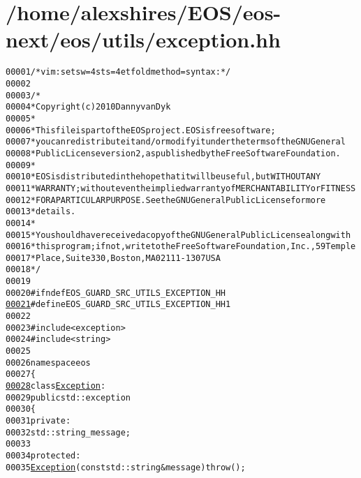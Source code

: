 \hypertarget{exception_8hh_source}{
\section{/home/alexshires/EOS/eos-\/next/eos/utils/exception.hh}
}


\begin{footnotesize}\begin{alltt}
00001 \textcolor{comment}{/* vim: set sw=4 sts=4 et foldmethod=syntax : */}
00002 
00003 \textcolor{comment}{/*}
00004 \textcolor{comment}{ * Copyright (c) 2010 Danny van Dyk}
00005 \textcolor{comment}{ *}
00006 \textcolor{comment}{ * This file is part of the EOS project. EOS is free software;}
00007 \textcolor{comment}{ * you can redistribute it and/or modify it under the terms of the GNU General}
00008 \textcolor{comment}{ * Public License version 2, as published by the Free Software Foundation.}
00009 \textcolor{comment}{ *}
00010 \textcolor{comment}{ * EOS is distributed in the hope that it will be useful, but WITHOUT ANY}
00011 \textcolor{comment}{ * WARRANTY; without even the implied warranty of MERCHANTABILITY or FITNESS}
00012 \textcolor{comment}{ * FOR A PARTICULAR PURPOSE.  See the GNU General Public License for more}
00013 \textcolor{comment}{ * details.}
00014 \textcolor{comment}{ *}
00015 \textcolor{comment}{ * You should have received a copy of the GNU General Public License along with}
00016 \textcolor{comment}{ * this program; if not, write to the Free Software Foundation, Inc., 59 Temple}
00017 \textcolor{comment}{ * Place, Suite 330, Boston, MA  02111-1307  USA}
00018 \textcolor{comment}{ */}
00019 
00020 \textcolor{preprocessor}{#ifndef EOS\_GUARD\_SRC\_UTILS\_EXCEPTION\_HH}
\hypertarget{exception_8hh_source_l00021}{}\hyperlink{exception_8hh_a7c97e00f75990f4c9e9691efe6eaf396}{00021} \textcolor{preprocessor}{}\textcolor{preprocessor}{#define EOS\_GUARD\_SRC\_UTILS\_EXCEPTION\_HH 1}
00022 \textcolor{preprocessor}{}
00023 \textcolor{preprocessor}{#include <exception>}
00024 \textcolor{preprocessor}{#include <string>}
00025 
00026 \textcolor{keyword}{namespace }eos
00027 \{
\hypertarget{exception_8hh_source_l00028}{}\hyperlink{classeos_1_1Exception}{00028}     \textcolor{keyword}{class }\hyperlink{classeos_1_1Exception}{Exception} :
00029         \textcolor{keyword}{public} std::exception
00030     \{
00031         \textcolor{keyword}{private}:
00032             std::string \_message;
00033 
00034         \textcolor{keyword}{protected}:
00035             \hyperlink{classeos_1_1Exception_acbc0fa64ca3d54cc1f828b07dc80e585}{Exception}(\textcolor{keyword}{const} std::string & message) \textcolor{keywordflow}{throw} ();

\end{alltt}
\end{footnotesize}
